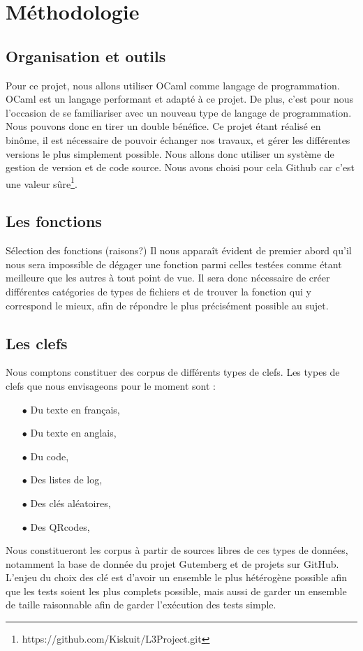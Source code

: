 \documentclass[final,twoside,twocolumn,10pt]{scrartcl}
\begin{document}
	
\section{Méthodologie}
	\subsection{Organisation et outils}
		Pour ce projet, nous allons utiliser OCaml comme langage de programmation. OCaml est un langage performant et 	adapté à ce projet. De plus, c'est pour nous l'occasion de se familiariser avec un nouveau type de langage de programmation. Nous pouvons donc en tirer un double bénéfice.
	Ce projet étant réalisé en binôme, il est nécessaire de pouvoir échanger nos travaux, et gérer les différentes versions le plus simplement possible. Nous allons donc utiliser un système de gestion de version et de code source. Nous avons choisi pour cela Github car c'est une valeur sûre\footnote{https://github.com/Kiskuit/L3Project.git}.
		
	\subsection{Les fonctions}
		Sélection des fonctions (raisons?)
		Il nous apparaît évident de premier abord qu'il nous sera impossible de dégager une fonction parmi celles testées comme étant meilleure que les autres à tout point de vue. Il sera donc nécessaire de créer différentes catégories de types de fichiers et de trouver la fonction qui y correspond le mieux, afin de répondre le plus précisément possible au sujet.
		
	\subsection{Les clefs}
		Nous comptons constituer des corpus de différents types de clefs. Les types de clefs que nous envisageons pour le moment sont :
		\begin{itemize}
			\item[$\bullet$]Du texte en français,
			\item[$\bullet$]Du texte en anglais,
			\item[$\bullet$]Du code,
			\item[$\bullet$]Des listes de log,
			\item[$\bullet$]Des clés aléatoires,
			\item[$\bullet$]Des QRcodes,
		\end{itemize}
		Nous constitueront les corpus à partir de sources libres de ces types de données, notamment la base de donnée du projet Gutemberg et de projets sur GitHub. L'enjeu du choix des clé est d'avoir un ensemble le plus hétérogène possible afin que les tests soient les plus complets possible, mais aussi de garder un ensemble de taille raisonnable afin de garder l'exécution des tests simple.
		
\end{document}
